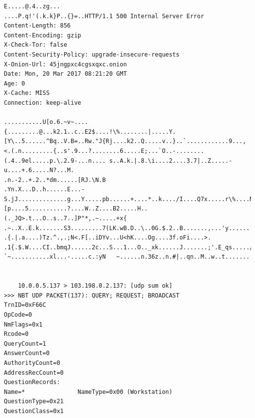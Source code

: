 \documentclass[11pt]{diazessay} %
\begin{document}
\begin{lstlisting}
E.....@.4..zg...
....P.q!'(.k.k}P..{}=..HTTP/1.1 500 Internal Server Error
Content-Length: 856
Content-Encoding: gzip
X-Check-Tor: false
Content-Security-Policy: upgrade-insecure-requests
X-Onion-Url: 45jngpxc4cgsxqxc.onion
Date: Mon, 20 Mar 2017 08:21:20 GMT
Age: 0
X-Cache: MISS
Connection: keep-alive

...........U[o.6.~v~....{.........@...k2.1..c..E2$....!\%........|.....Y.[Y\..5......^Bq..V.B=..Rw."J{Rj....k2..Q.....v..}..`............9...,<.(.n.........{..s'.9...?........6.....E;...`O..-........(.4..9el.....p.\.2.9-...n.... s..A.k.|.8.\i....2....3.7|..Z.....-u....+.6.....N?...M.
.n.-2..+.2..*dm......[RJ.\N.B
.Yn.X...D..h......E...-S.jJ..............g...Y.....pb......+....*..k..../I....Q7x.....r\%....NT...l:=.}2..r..[p....5...........?....W..Z....B2.....H..(._JQ>.t...O..s..7..]P"*,.~.....+x{ .~..X..E.k.......S3.........7(LK.wB.D..\..0G.$.2..B.......,...'y.......,H...   .{.|.a....)Tz.^.,.;N<.F[..iDYv...U<hK....Og....3f.oFi....>.
.1{.$.W....CI..bmqJ......2c...S...1...O.._xk......J.......;'.E_qs...../.....S.!...}.}.N!I....c..V..c..o\%.2.R.....D...l...0..m....?.....?}K.X.........ry?`~...........xl...-.....c.:yN   ~......n.36z..n.#|..qn..M..w..t.......


    10.0.0.5.137 > 103.198.0.2.137: [udp sum ok]
>>> NBT UDP PACKET(137): QUERY; REQUEST; BROADCAST
TrnID=0xF66C
OpCode=0
NmFlags=0x1
Rcode=0
QueryCount=1
AnswerCount=0
AuthorityCount=0
AddressRecCount=0
QuestionRecords:
Name=*               NameType=0x00 (Workstation)
QuestionType=0x21
QuestionClass=0x1
\end{lstlisting}
\end{document}
